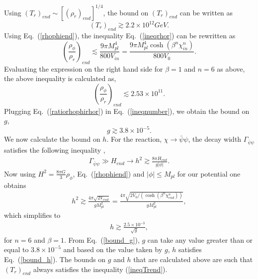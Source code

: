 \documentclass[prd,twocolumn,superscriptaddress]{revtex4}
\begin{document}
\begin{appendices}
\begin{equation}
\end{equation}
Using $(T_r)_{end} \sim [(\rho_r)_{end}]^{1/4}$, the bound on $(T_r)_{end}$ can be written as
\begin{equation}
 (T_r)_{end} \gtrsim 2.2 \times 10^{12} GeV. \label{ineqTrend}
\end{equation}
Using Eq.~(\ref{rhophiend}), the inequality  Eq.~(\ref{ineqrhor}) can be rewritten as
\begin{equation}
 \left(\frac{\rho_{\phi}}{\rho_r}\right)_{end} \lesssim \frac{9 \pi M_{pl}^4}{800 V_{in}} =
 \frac{9 \pi M_{pl}^4 \cosh{(\beta^n \chi_{in}^n)}}{800 V_{0}}.
\end{equation}
Evaluating the  expression on the right hand side for $\beta=1$ and $n=6$ as above, the above inequality is calculated as,
\begin{equation}
 \left(\frac{\rho_{\phi}}{\rho_r}\right)_{end} \lesssim 2.53 \times 10^{11}. \label{ineqnumber}
\end{equation}
Plugging Eq.~(\ref{ratiorhophirhor}) in Eq.~(\ref{ineqnumber}), we obtain the bound on $g$,
\begin{equation}
 g\gtrsim 3.8 \times 10^{-5}. \label{bound_g}
\end{equation}
 We now calculate the bound on $h$. For the reaction,
 $\chi \rightarrow \bar{\psi} \psi$, the decay width $\Gamma_{\bar{\psi} \psi}$ satisfies the following inequality
 \cite{LDH,BPS,Starobinsky,Starobinsky2,ala,VariableGravity,SamiDadich,FermionPreheating,Campos1,Campos2,
 InstantPreheating,InstantPreheating2,QIRGWBSamiSahni},
 \begin{eqnarray}
  \Gamma_{\bar{\psi} \psi} \gg H_{end} \rightarrow h^2 \gtrsim \frac{8 \pi H_{end}}{g |\phi|}  .
 \end{eqnarray}
Now using $H^2 = \frac{8 \pi G}{3} \rho_{\phi}$, Eq.~(\ref{rhophiend}) and  $|\phi| \leq M_{pl}$ for our potential one obtains
  \begin{eqnarray}
   h^2 \gtrsim  \frac{ 4 \pi \sqrt{2 V_{end}}}{g M_{pl}^2} = \frac{ 4 \pi \sqrt{2 V_0/(\cosh{(\beta^n \chi_{end}^n)}) }}{g M_{pl}^2} ,
  \end{eqnarray}
which simplifies to
\begin{eqnarray}
 h \gtrsim \frac{2.5 \times 10^{-3}}{\sqrt{g}} \label{bound_h},
\end{eqnarray}
for $n=6$ and $\beta=1$.  From Eq.~(\ref{bound_g}),  $g$ can take any value greater than or equal to $3.8 \times 10^{-5}$ and based on the value taken by
 $g$, $h$ satisfies  Eq.~(\ref{bound_h}). The bounds on $g$ and $h$ that are calculated above are such that $(T_{r})_{end}$ always
 satisfies the inequality (\ref{ineqTrend}). 
 

\end{appendices}
\end{document}
